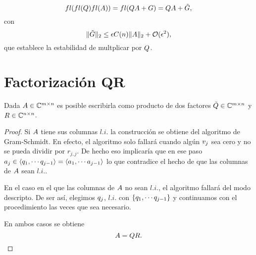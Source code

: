 \begin{tcolorbox}
$$
fl(fl(\Qb)fl(\Ab))=fl(\Qb\Ab+\Gb)=\Qb\Ab+\tilde\Gb,
$$
con
$$
\|\tilde \Gb\|_2\le \epsilon C(n)\|\Ab\|_2+\mathcal{O}(\epsilon^2),
$$
que establece la estabilidad de multplicar por $\Qb$.


\section{Factorización QR}
\tcc
\begin{teo}
Dada $\Ab\in \C^{m\times n}$ es posible escribirla como producto de dos factores $\tilde \Qb\in \C^{m\times n}$ y $\Rb\in \C^{n\times n}$.
 \end{teo}
\etcc

\begin{proof}
 Si $\Ab$ tiene sus columnas $l.i.$
 la construcción se obtiene del algoritmo de Gram-Schmidt. En efecto, el algoritmo solo fallará cuando algún $\vb_j$ sea cero y no se pueda dividir por $r_{j,j}$. De hecho eso implicaría que en ese paso $\ab_j\in \langle\qb_1,\cdots\qb_{j-1}\rangle=\langle\ab_1,\cdots\ab_{j-1}\rangle$ lo que contradice el hecho de que las columnas de $\Ab$ sean $l.i.$.

 En el caso en el que las columnas de $\Ab$ no sean $l.i.$, el algoritmo fallará del modo descripto. De ser así, elegimos $\qb_j$, $l.i.$ con
 $\{\qb_1,\cdots\qb_{j-1}\}$ y continuamos con el procedimiento las veces que sea necesario.

 En ambos casos se obtiene
 $$
 \Ab=\Qb\Rb.
 $$


\end{proof}
\end{tcolorbox}
